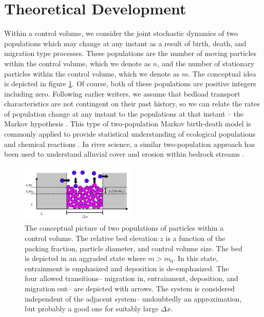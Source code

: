 \documentclass{article}
\begin{document}
\section{Theoretical Development}

Within a control volume, we consider the joint stochastic dynamics of two populations which may change at any instant as a result of birth, death, and migration type processes. 
These populations are the number of moving particles within the control volume, which we denote as $n$, and the number of stationary particles within the control volume, which we denote as $m$. 
The conceptual idea is depicted in figure \ref{fig:concept}. 
Of course, both of these populations are positive integers including zero. 
Following earlier writers, we assume that bedload transport characteristics are not contingent on their past history, so we can relate the rates of population change at any instant to the populations at that instant -- the Markov hypothesis \citep{Cox1965, Ancey2008}. 
This type of two-population Markov birth-death model is commonly applied to provide statistical understanding of ecological populations \citep{Cox1965, Pielou1977, Swift2002} and chemical reactions \citep{Gardiner1983, VanKampen1992, Gillespie2007}. 
In river science, a similar two-population approach has been used to understand alluvial cover and erosion within bedrock streams \citep{Turowski2009}.

\begin{figure}
    \includegraphics[width=0.5\textwidth]{./pfigures/diagram.png} %
    \caption{The conceptual picture of two populations of particles within a control volume. 
The relative bed elevation $z$ is a function of the packing fraction, particle diameter, and control volume size. 
The bed is depicted in an aggraded state where $m>m_0$. In this state, entrainment is emphasized and deposition is de-emphasized.
The four allowed transitions-- migration in, entrainment, deposition, and migration out-- are depicted with arrows. 
The system is considered independent of the adjacent system-- undoubtedly an approximation, but probably a good one for suitably large $\Delta x$. \label{fig:concept} }
\end{figure}
\end{document}
